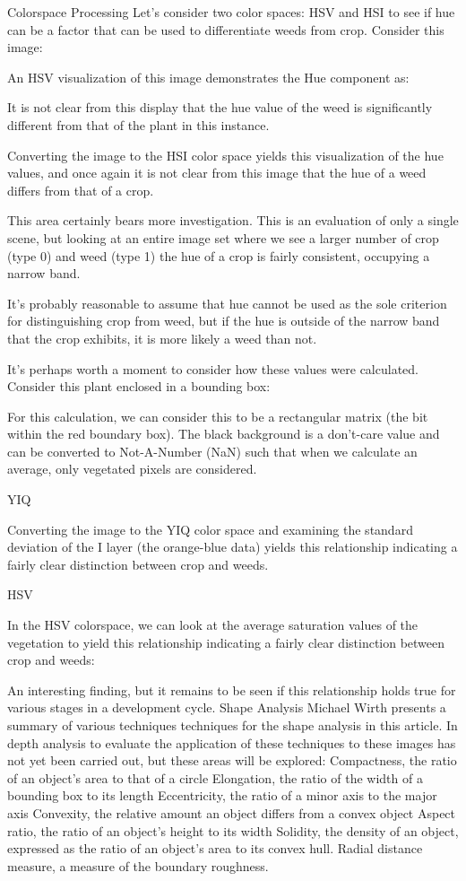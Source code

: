 \documentclass[letterpaper]{article}
\begin{document}
Colorspace Processing
Let’s consider two color spaces: HSV and HSI to see if hue can be a factor that can be used to differentiate weeds from crop. Consider this image:




An HSV visualization of this image demonstrates the Hue component as:

It is not clear from this display that the hue value of the weed is significantly different from that of the plant in this instance.

Converting the image to the HSI color space yields this visualization of the hue values, and once again it is not clear from this image that the hue of a weed differs from that of a crop.

This area certainly bears more investigation. This is an evaluation of only a single scene, but looking at an entire image set where we see a larger number of crop (type 0) and weed (type 1) the hue of a crop is fairly consistent, occupying a narrow band. 


It’s probably reasonable to assume that hue cannot be used as the sole criterion for distinguishing crop from weed, but if the hue is outside of the narrow band that the crop exhibits, it is more likely a weed than not.

It’s perhaps worth a moment to consider how these values were calculated.  Consider this plant enclosed in a bounding box:



For this calculation, we can consider this to be a rectangular matrix (the bit within the red boundary box). The black background is a don’t-care value and can be converted to Not-A-Number (NaN) such that when we calculate an average, only vegetated pixels are considered.

YIQ

Converting the image to the YIQ color space and examining the standard deviation of the I layer (the orange-blue data) yields this relationship indicating a fairly clear distinction between crop and weeds.



HSV

In the HSV colorspace, we can look at the average saturation values of the vegetation to yield this relationship indicating a fairly clear distinction between crop and weeds:



An interesting finding, but it remains to be seen if this relationship holds true for various stages in a development cycle.
Shape Analysis
Michael Wirth presents a summary of various techniques techniques for the shape analysis in this article. In depth analysis to evaluate the application of these techniques to these images has not yet been carried out, but these areas will be explored:
Compactness, the ratio of an object’s area to that of a circle
Elongation, the ratio of the width of a bounding box to its length
Eccentricity, the ratio of a minor axis to the major axis
Convexity, the relative amount an object differs from a convex object
Aspect ratio, the ratio of an object’s height to its width
Solidity, the density of an object, expressed as the ratio of an object’s area to its convex hull.
Radial distance measure, a measure of the boundary roughness.
\end{document}
